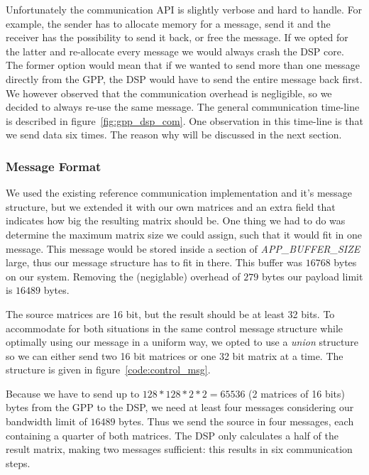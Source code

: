 Unfortunately the communication API is slightly verbose and hard to handle.
For example, the sender has to allocate memory for a message, send it and the
receiver has the possibility to send it back, or free the message. If we opted
for the latter and re-allocate every message we would always crash the DSP core.
The former option would mean that if we wanted to send more than one message
directly from the GPP, the DSP would have to send the entire message back first.
We however observed that the communication overhead is negligible, so we
decided to always re-use the same message. The general communication time-line
is described in figure~\ref{fig:gpp_dsp_com}. One observation in this time-line
is that we send data six times. The reason why will be discussed in the next
section.

\subsubsection{Message Format}
We used the existing reference communication implementation and it's message
structure, but we extended it with our own matrices and an extra field that
indicates how big the resulting matrix should be. One thing we had to do
was determine the maximum matrix size we could assign, such that it would fit
in one message. This message would be stored inside a section of
\emph{APP\_BUFFER\_SIZE} large, thus our message structure has to fit in there.
This buffer was $16768$ bytes on our system.
Removing the (negiglable) overhead of $279$ bytes our payload limit is $16489$ bytes.

The source matrices are 16 bit, but the result should be at least 32 bits.
To accommodate for both
situations in the same control message structure while optimally using our
message in a uniform way, we opted to use a \emph{union} structure so we
can either send two 16 bit matrices or one 32 bit matrix at a time. The
structure is given in figure~\ref{code:control_msg}.

Because we have to send up to $128*128*2*2=65536$ (2 matrices of 16 bits)
bytes from the GPP to the DSP, we need at least four messages considering
our bandwidth limit of $16489$ bytes. Thus we send the source in four messages,
each containing a quarter of both matrices. The DSP only calculates a half of
the result matrix, making two messages sufficient: this results in six
communication steps.


